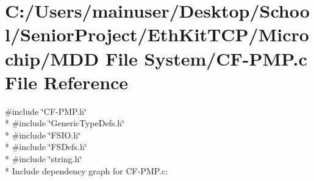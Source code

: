 \hypertarget{_c_f-_p_m_p_8c}{}\section{C\+:/\+Users/mainuser/\+Desktop/\+School/\+Senior\+Project/\+Eth\+Kit\+T\+C\+P/\+Microchip/\+M\+D\+D File System/\+C\+F-\/\+P\+M\+P.c File Reference}
\label{_c_f-_p_m_p_8c}
{\ttfamily \#include \char`\"{}C\+F-\/\+P\+M\+P.\+h\char`\"{}}\\*
{\ttfamily \#include \char`\"{}Generic\+Type\+Defs.\+h\char`\"{}}\\*
{\ttfamily \#include \char`\"{}F\+S\+I\+O.\+h\char`\"{}}\\*
{\ttfamily \#include \char`\"{}F\+S\+Defs.\+h\char`\"{}}\\*
{\ttfamily \#include \char`\"{}string.\+h\char`\"{}}\\*
Include dependency graph for C\+F-\/\+P\+M\+P.c\+:
